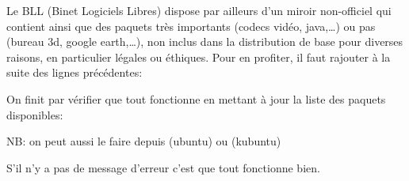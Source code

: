 

Le BLL (Binet Logiciels Libres) dispose par ailleurs d'un miroir non-officiel qui contient  ainsi que des paquets tr\`es importants (codecs
vid\'eo, java,\dots) ou pas (bureau 3d, google earth,\dots), non inclus dans la distribution de base pour diverses raisons, en particulier l\'egales ou
\'ethiques. Pour en profiter, il faut rajouter \`a la suite des lignes pr\'ec\'edentes:



On finit par v\'erifier que tout fonctionne en mettant \`a jour la liste
des paquets disponibles:


NB: on peut aussi le faire depuis  (ubuntu) ou  (kubuntu)

S'il n'y a pas de message d'erreur c'est que tout fonctionne bien.
